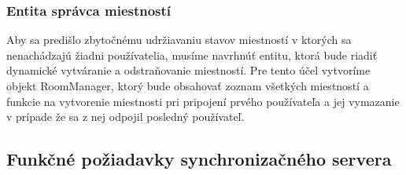 \subsubsection{Entita správca miestností}
Aby sa predišlo zbytočnému udržiavaniu stavov miestností v ktorých sa nenachádzajú žiadni používatelia, musíme navrhnúť entitu, ktorá bude riadiť dynamické vytváranie a odstraňovanie miestností. Pre tento účel vytvoríme objekt RoomManager, ktorý bude obsahovať zoznam všetkých miestností a funkcie na vytvorenie miestnosti pri pripojení prvého používateľa a jej vymazanie v prípade že sa z nej odpojil posledný používateľ.

\subsection{Funkčné požiadavky synchronizačného servera}

